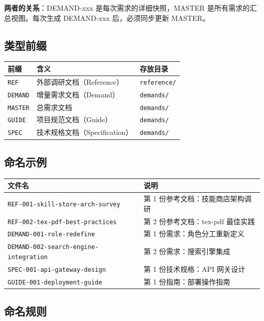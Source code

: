 \documentclass[11pt,a4paper]{article}
\begin{document}
\textbf{两者的关系}：DEMAND-xxx 是每次需求的详细快照，MASTER 是所有需求的汇总视图。每次生成 DEMAND-xxx 后，必须同步更新 MASTER。

\subsection{类型前缀}

\begin{table}[h]
\centering
\begin{tabular}{lll}
\toprule
\textbf{前缀} & \textbf{含义} & \textbf{存放目录} \\
\midrule
\texttt{REF} & 外部调研文档（Reference） & \texttt{reference/} \\
\texttt{DEMAND} & 增量需求文档（Demand） & \texttt{demands/} \\
\texttt{MASTER} & 总需求文档 & \texttt{demands/} \\
\texttt{GUIDE} & 项目规范文档（Guide） & \texttt{demands/} \\
\texttt{SPEC} & 技术规格文档（Specification） & \texttt{demands/} \\
\bottomrule
\end{tabular}
\end{table}

\subsection{命名示例}

\begin{table}[h]
\centering
\begin{tabular}{ll}
\toprule
\textbf{文件名} & \textbf{说明} \\
\midrule
\texttt{REF-001-skill-store-arch-survey} & 第 1 份参考文档：技能商店架构调研 \\
\texttt{REF-002-tex-pdf-best-practices} & 第 2 份参考文档：tex-pdf 最佳实践 \\
\texttt{DEMAND-001-role-redefine} & 第 1 份需求：角色分工重新定义 \\
\texttt{DEMAND-002-search-engine-integration} & 第 2 份需求：搜索引擎集成 \\
\texttt{SPEC-001-api-gateway-design} & 第 1 份技术规格：API 网关设计 \\
\texttt{GUIDE-001-deployment-guide} & 第 1 份指南：部署操作指南 \\
\bottomrule
\end{tabular}
\end{table}

\subsection{命名规则}
\end{document}
